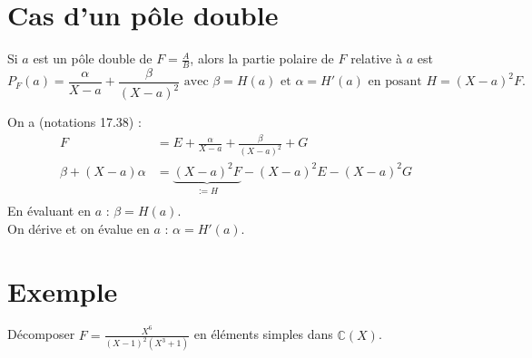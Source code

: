 \documentclass[../main.tex]{subfiles}
\begin{document}
\section{Cas d'un pôle double}
\begin{tcolorbox}[title=Propostion 17.40, title filled=false, colframe=lightblue, colback=lightblue!10!white]
    Si $a$ est un pôle double de $F = \frac{A}{B}$, alors la partie polaire de $F$ relative à $a$ est
    $$P_F(a) = \frac{\alpha}{X - a} + \frac{\beta}{(X - a)^2} \text{ avec } \beta = H(a) \text{ et } \alpha = H'(a) \text{ en posant } H = (X - a)^2 F.$$
\end{tcolorbox}

\noindent On a (notations 17.38) : 
\begin{align*}
    F &= E + \frac{\alpha}{X - a} + \frac{\beta}{(X - a)^2} + G \\
    \beta + (X - a) \alpha &= \underbrace{(X - a)^2 F}_{:= H} - (X - a)^2 E - (X - a)^2 G \\
\end{align*}
En évaluant en $a$ : $\beta = H(a)$. \\
On dérive et on évalue en $a$ : $\alpha = H'(a)$.

\section{Exemple}
\begin{tcolorbox}[title=Exemple 17.42, title filled=false, colframe=darkgreen, colback=darkgreen!10!white]
    Décomposer $F = \frac{X^6}{(X - 1)^2(X^3 + 1)}$ en éléments simples dans $\mathbb{C}(X)$. 
\end{tcolorbox}
\end{document}

